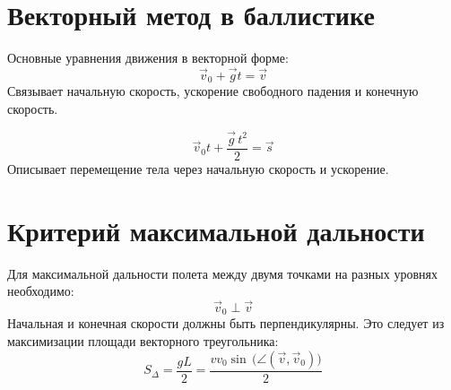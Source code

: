 \documentclass{article}
\begin{document}
\section*{Векторный метод в баллистике}

Основные уравнения движения в векторной форме:
\[
\vec v_0 + \vec gt = \vec v
\]
Связывает начальную скорость, ускорение свободного падения и конечную скорость.

\[
\vec v_0t + \frac{\vec g\,t^2}{2} = \vec s
\]
Описывает перемещение тела через начальную скорость и ускорение.

\section*{Критерий максимальной дальности}

Для максимальной дальности полета между двумя точками на разных уровнях необходимо:
\[
\vec v_0 \perp \vec v
\]
Начальная и конечная скорости должны быть перпендикулярны. Это следует из максимизации площади векторного треугольника:
\[
S_\Delta = \frac{gL}{2} = \frac{vv_0\sin\!\,\bigl(\angle(\vec v,\vec v_0)\bigr)}{2}
\]
\end{document}
